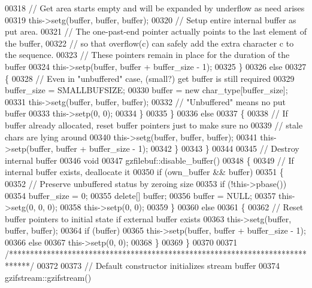 \begin{DoxyCode}
{00318       \textcolor{comment}{// Get area starts empty and will be expanded by underflow as need arises}
00319       this->setg(buffer, buffer, buffer);
00320       \textcolor{comment}{// Setup entire internal buffer as put area.}
00321       \textcolor{comment}{// The one-past-end pointer actually points to the last element of the buffer,}
00322       \textcolor{comment}{// so that overflow(c) can safely add the extra character c to the sequence.}
00323       \textcolor{comment}{// These pointers remain in place for the duration of the buffer}
00324       this->setp(buffer, buffer + buffer\_size - 1);
00325     \}
00326     \textcolor{keywordflow}{else}
00327     \{
00328       \textcolor{comment}{// Even in "unbuffered" case, (small?) get buffer is still required}
00329       buffer\_size = SMALLBUFSIZE;
00330       buffer = \textcolor{keyword}{new} char\_type[buffer\_size];
00331       this->setg(buffer, buffer, buffer);
00332       \textcolor{comment}{// "Unbuffered" means no put buffer}
00333       this->setp(0, 0);
00334     \}
00335   \}
00336   \textcolor{keywordflow}{else}
00337   \{
00338     \textcolor{comment}{// If buffer already allocated, reset buffer pointers just to make sure no}
00339     \textcolor{comment}{// stale chars are lying around}
00340     this->setg(buffer, buffer, buffer);
00341     this->setp(buffer, buffer + buffer\_size - 1);
00342   \}
00343 \}
00344 
00345 \textcolor{comment}{// Destroy internal buffer}
00346 \textcolor{keywordtype}{void}
00347 gzfilebuf::disable\_buffer()
00348 \{
00349   \textcolor{comment}{// If internal buffer exists, deallocate it}
00350   \textcolor{keywordflow}{if} (own\_buffer && buffer)
00351   \{
00352     \textcolor{comment}{// Preserve unbuffered status by zeroing size}
00353     \textcolor{keywordflow}{if} (!this->pbase())
00354       buffer\_size = 0;
00355     \textcolor{keyword}{delete}[] buffer;
00356     buffer = NULL;
00357     this->setg(0, 0, 0);
00358     this->setp(0, 0);
00359   \}
00360   \textcolor{keywordflow}{else}
00361   \{
00362     \textcolor{comment}{// Reset buffer pointers to initial state if external buffer exists}
00363     this->setg(buffer, buffer, buffer);
00364     \textcolor{keywordflow}{if} (buffer)
00365       this->setp(buffer, buffer + buffer\_size - 1);
00366     \textcolor{keywordflow}{else}
00367       this->setp(0, 0);
00368   \}
00369 \}
00370 
00371 \textcolor{comment}{/*****************************************************************************/}
00372 
00373 \textcolor{comment}{// Default constructor initializes stream buffer}
00374 gzifstream::gzifstream()
}
\end{DoxyCode}
